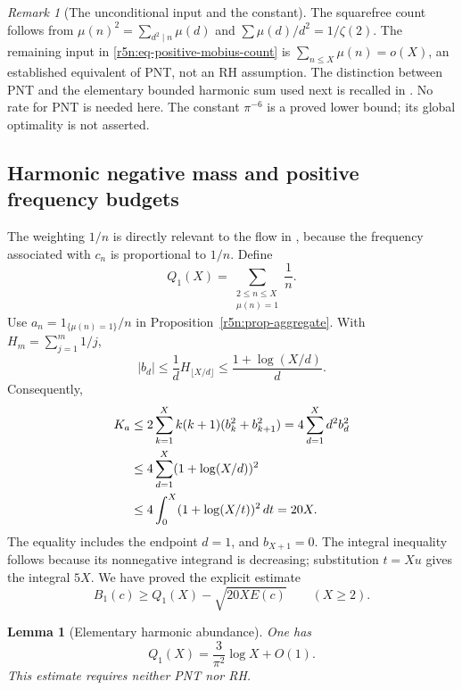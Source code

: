 \documentclass[11pt,a4paper]{article}
\newtheorem{lemma}[theorem]{Lemma}
\theoremstyle{definition}\newtheorem{definition}[theorem]{Definition}
\theoremstyle{remark}\newtheorem{remark}[theorem]{Remark}
\numberwithin{equation}{section}
\begin{document}
\begin{remark}[The unconditional input and the constant]
\label{r5n:rem-pnt}
The squarefree count follows from
\(\mu(n)^2=\sum_{d^2\mid n}\mu(d)\) and
\(\sum\mu(d)/d^2=1/\zeta(2)\). The remaining input in
\eqref{r5n:eq-positive-mobius-count} is
\(\sum_{n\le X}\mu(n)=o(X)\), an established equivalent of PNT,
not an RH assumption. The distinction between PNT and the
elementary bounded harmonic sum used next is recalled in
\cite{TaoMobius}. No rate for PNT is needed here.
The constant \(\pi^{-6}\) is a proved lower bound; its global
optimality is not asserted.
\end{remark}

\subsection{Harmonic negative mass and positive frequency budgets}
\label{r5n:subsec-harmonic}

The weighting \(1/n\) is directly relevant to the flow in
\cite{VMRC200}, because the frequency associated with \(c_n\)
is proportional to \(1/n\). Define
\[
 Q_1(X)=\sum_{\substack{2\le n\le X\\\mu(n)=1}}\frac1n.
\]
Use \(a_n=1_{\{\mu(n)=1\}}/n\) in
Proposition~\ref{r5n:prop-aggregate}. With
\(H_m=\sum_{j=1}^m1/j\),
\begin{equation}
\label{r5n:eq-harmonic-bd}
 |b_d|\le\frac1dH_{\lfloor X/d\rfloor}
       \le\frac{1+\log(X/d)}d.
\end{equation}
Consequently,
\begin{align}
\label{r5n:eq-harmonic-dual}
 K_a
 &\le2\sum_{k=1}^X k(k+1)(b_k^2+b_{k+1}^2)
   =4\sum_{d=1}^Xd^2b_d^2 \notag\\
 &\le4\sum_{d=1}^X(1+\log(X/d))^2 \notag\\
 &\le4\int_0^X(1+\log(X/t))^2\,dt
   =20X.
\end{align}
The equality includes the endpoint \(d=1\), and \(b_{X+1}=0\).
The integral inequality follows because its nonnegative integrand
is decreasing; substitution \(t=Xu\) gives the integral \(5X\).
We have proved the explicit estimate
\begin{equation}
\label{r5n:eq-harmonic-finite}
 \boxed{B_1(c)\ge Q_1(X)-\sqrt{20XE(c)}
       \qquad(X\ge2).}
\end{equation}

\begin{lemma}[Elementary harmonic abundance]
\label{r5n:lem-harmonic-abundance}
One has
\begin{equation}
\label{r5n:eq-harmonic-abundance}
 Q_1(X)=\frac3{\pi^2}\log X+O(1).
\end{equation}
This estimate requires neither PNT nor RH.
\end{lemma}
\end{document}

